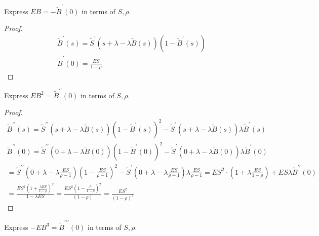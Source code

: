 \begin{prob}
Express $EB = -\widetilde{B}^{\prime}(0)$ in terms of $S, \rho$.
\end{prob}

\begin{proof}
\begin{gather*}
    \widetilde{B}^{\prime}(s)
    = \widetilde{S}^{\prime} (s + \lambda - \lambda \widetilde{B}(s))(1 - \widetilde{B}^{\prime}(s))\\
    \widetilde{B}^{\prime}(0)
    = \frac{ES}{1 - \rho}
\end{gather*}
\end{proof}
\vskip 0.6in



\begin{prob}
Express $EB^2 = \widetilde{B}^{\prime\prime}(0)$ in terms of $S, \rho$.
\end{prob}

\begin{proof}
\begin{gather*}
    \widetilde{B}^{\prime\prime}(s)
    = \widetilde{S}^{\prime\prime} (s + \lambda - \lambda \widetilde{B}(s))(1 - \widetilde{B}^{\prime}(s))^2
    - \widetilde{S}^{\prime} (s + \lambda - \lambda \widetilde{B}(s)) \lambda \widetilde{B}^{\prime}(s)\\
    \widetilde{B}^{\prime\prime}(0)
    = \widetilde{S}^{\prime\prime} (0 + \lambda - \lambda \widetilde{B}(0))(1 - \widetilde{B}^{\prime}(0))^2
    - \widetilde{S}^{\prime} (0 + \lambda - \lambda \widetilde{B}(0)) \lambda \widetilde{B}^{\prime}(0)\\
    = \widetilde{S}^{\prime\prime} (0 + \lambda - \lambda \frac{ES}{\rho - 1})(1 - \frac{ES}{\rho - 1})^2
    - \widetilde{S}^{\prime} (0 + \lambda - \lambda \frac{ES}{\rho - 1}) \lambda \frac{ES}{\rho - 1}
    = ES^2 \cdot (1 + \lambda \frac{ES}{1 - \rho}) + ES \lambda \widetilde{B}^{\prime\prime}(0)\\
    = \frac{ES^2 (1 + \frac{\lambda ES}{1 - \rho})^2}{1 - \lambda ES}
    = \frac{ES^2 (1 - \frac{\rho}{1 - \rho})^2}{(1 - \rho)}
    = \frac{ES^2}{(1 - \rho)^3}
\end{gather*}
\end{proof}
\vskip 0.6in



\begin{prob}
Express $-EB^3 = \widetilde{B}^{\prime\prime\prime}(0)$ in terms of $S, \rho$.
\end{prob}

